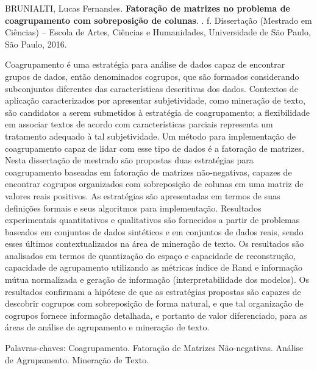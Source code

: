 \documentclass[
    12pt,                %
    oneside,            %
    a4paper,            %
    english,            %
    brazil                %
    ]{abntex2ppgsi}
\begin{document}
\setlength{\absparsep}{18pt} %
\begin{resumo}

%
%
%
%
\begin{flushleft}
BRUNIALTI, Lucas Fernandes. \textbf{Fatoração de matrizes no problema de coagrupamento com sobreposição de colunas}. \imprimirdata. \pageref{LastPage} f. Dissertação (Mestrado em Ciências) – Escola de Artes, Ciências e Humanidades, Universidade de São Paulo, São Paulo, 2016.
\end{flushleft}

Coagrupamento é uma estratégia para análise de dados capaz de encontrar grupos de dados, então denominados cogrupos, que são formados considerando subconjuntos diferentes das  características descritivas dos dados.
Contextos de aplicação caracterizados por apresentar subjetividade, como mineração de texto, são candidatos a serem submetidos à estratégia de coagrupamento; a flexibilidade em associar textos de acordo com características parciais representa um tratamento adequado à tal subjetividade.
Um método para implementação de coagrupamento capaz de lidar com esse tipo de dados é a fatoração de matrizes.
Nesta dissertação de mestrado são propostas duas estratégias para coagrupamento baseadas em fatoração de matrizes não-negativas, capazes de encontrar cogrupos organizados com sobreposição de colunas em uma matriz de valores reais positivos.
As estratégias são apresentadas em termos de suas definições formais e seus algoritmos para implementação.
Resultados experimentais quantitativos e qualitativos são fornecidos a partir de problemas baseados em conjuntos de dados sintéticos e em conjuntos de dados reais, sendo esses últimos contextualizados na área de mineração de texto.
Os resultados são analisados em termos de quantização do espaço e capacidade de reconstrução, capacidade de agrupamento utilizando as métricas índice de Rand e informação mútua normalizada e geração de informação (interpretabilidade dos modelos).
Os resultados confirmam a hipótese de que as estratégias propostas são capazes de descobrir cogrupos com sobreposição de forma natural, e que tal organização de cogrupos fornece informação detalhada, e portanto de valor diferenciado, para as áreas de análise de agrupamento e mineração de texto.

Palavras-chaves: Coagrupamento. Fatoração de Matrizes Não-negativas. Análise de Agrupamento. Mineração de Texto.
\end{resumo}
\end{document}

